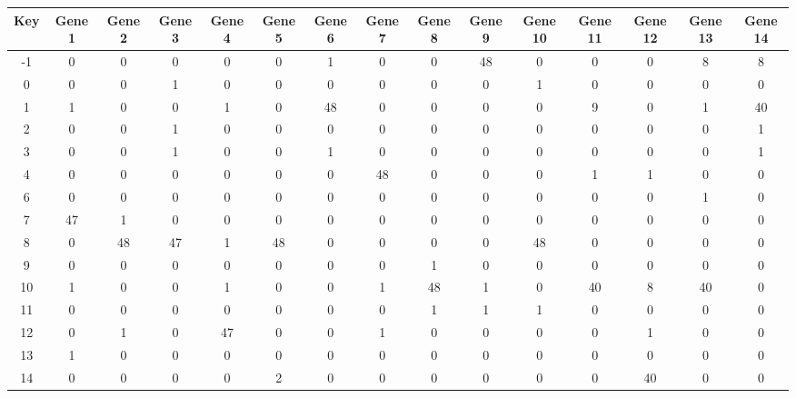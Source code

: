 \begin{tabular}{|c|c|c|c|c|c|c|c|c|c|c|c|c|c|c|}
\hline
Key & Gene 1 & Gene 2 & Gene 3 & Gene 4 & Gene 5 & Gene 6 & Gene 7 & Gene 8 & Gene 9 & Gene 10 & Gene 11 & Gene 12 & Gene 13 & Gene 14 \\
\hline
-1 & 0 & 0 & 0 & 0 & 0 & 1 & 0 & 0 & 48 & 0 & 0 & 0 & 8 & 8 \\
0 & 0 & 0 & 1 & 0 & 0 & 0 & 0 & 0 & 0 & 1 & 0 & 0 & 0 & 0 \\
1 & 1 & 0 & 0 & 1 & 0 & 48 & 0 & 0 & 0 & 0 & 9 & 0 & 1 & 40 \\
2 & 0 & 0 & 1 & 0 & 0 & 0 & 0 & 0 & 0 & 0 & 0 & 0 & 0 & 1 \\
3 & 0 & 0 & 1 & 0 & 0 & 1 & 0 & 0 & 0 & 0 & 0 & 0 & 0 & 1 \\
4 & 0 & 0 & 0 & 0 & 0 & 0 & 48 & 0 & 0 & 0 & 1 & 1 & 0 & 0 \\
6 & 0 & 0 & 0 & 0 & 0 & 0 & 0 & 0 & 0 & 0 & 0 & 0 & 1 & 0 \\
7 & 47 & 1 & 0 & 0 & 0 & 0 & 0 & 0 & 0 & 0 & 0 & 0 & 0 & 0 \\
8 & 0 & 48 & 47 & 1 & 48 & 0 & 0 & 0 & 0 & 48 & 0 & 0 & 0 & 0 \\
9 & 0 & 0 & 0 & 0 & 0 & 0 & 0 & 1 & 0 & 0 & 0 & 0 & 0 & 0 \\
10 & 1 & 0 & 0 & 1 & 0 & 0 & 1 & 48 & 1 & 0 & 40 & 8 & 40 & 0 \\
11 & 0 & 0 & 0 & 0 & 0 & 0 & 0 & 1 & 1 & 1 & 0 & 0 & 0 & 0 \\
12 & 0 & 1 & 0 & 47 & 0 & 0 & 1 & 0 & 0 & 0 & 0 & 1 & 0 & 0 \\
13 & 1 & 0 & 0 & 0 & 0 & 0 & 0 & 0 & 0 & 0 & 0 & 0 & 0 & 0 \\
14 & 0 & 0 & 0 & 0 & 2 & 0 & 0 & 0 & 0 & 0 & 0 & 40 & 0 & 0 \\
\hline
\end{tabular}